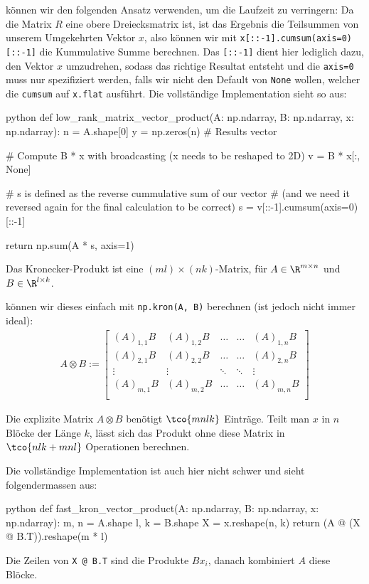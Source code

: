 \innumpy können wir den folgenden Ansatz verwenden, um die Laufzeit zu verringern:
Da die Matrix $R$ eine obere Dreiecksmatrix ist, ist das Ergebnis die Teilsummen von unserem Umgekehrten Vektor $x$,
also können wir mit \verb|x[::-1].cumsum(axis=0)[::-1]| die Kummulative Summe berechnen.
Das \verb|[::-1]| dient hier lediglich dazu, den Vektor $x$ umzudrehen, sodass das richtige Resultat entsteht und die \texttt{axis=0} muss nur spezifiziert werden,
falls wir nicht den Default von \texttt{None} wollen, welcher die \texttt{cumsum} auf \texttt{x.flat} ausführt.
Die vollständige Implementation sieht so aus:
\begin{code}{python}
    def low_rank_matrix_vector_product(A: np.ndarray, B: np.ndarray, x: np.ndarray):
        n = A.shape[0]
        y = np.zeros(n) # Results vector

        # Compute B * x with broadcasting (x needs to be reshaped to 2D)
        v = B * x[:, None]

        # s is defined as the reverse cummulative sum of our vector
        # (and we need it reversed again for the final calculation to be correct)
        s = v[::-1].cumsum(axis=0)[::-1]

        return np.sum(A * s, axis=1)
\end{code}


 Das Kronecker-Produkt ist eine $(ml) \times (nk)$-Matrix, für $A \in \R^{m \times n}$ und $B \in \R^{l \times k}$.

\innumpy können wir dieses einfach mit \verb|np.kron(A, B)| berechnen (ist jedoch nicht immer ideal):
\begin{align*}
    A \otimes B :=
    \begin{bmatrix}
        (A)_{1, 1} B & (A)_{1, 2}B & \ldots & \ldots & (A)_{1, n} B \\
        (A)_{2, 1} B & (A)_{2, 2}B & \ldots & \ldots & (A)_{2, n} B \\
        \vdots       & \vdots      & \ddots & \ddots & \vdots       \\
        (A)_{m, 1} B & (A)_{m, 2}B & \ldots & \ldots & (A)_{m, n} B \\
    \end{bmatrix}
\end{align*}

 Die explizite Matrix $A\otimes B$ benötigt $\tco{mnlk}$ Einträge. Teilt man $x$ in $n$ Blöcke der Länge $k$, lässt sich das Produkt ohne diese Matrix in $\tco{nlk+mnl}$ Operationen berechnen.

Die vollständige Implementation ist auch hier nicht schwer und sieht folgendermassen aus:
\begin{code}{python}
    def fast_kron_vector_product(A: np.ndarray, B: np.ndarray, x: np.ndarray):
        m, n = A.shape
        l, k = B.shape
        X = x.reshape(n, k)
        return (A @ (X @ B.T)).reshape(m * l)
\end{code}

Die Zeilen von \verb|X @ B.T| sind die Produkte $Bx_i$, danach kombiniert $A$ diese Blöcke.
